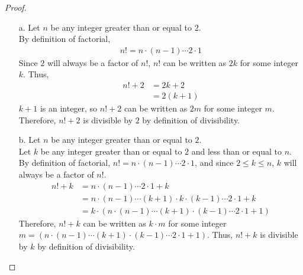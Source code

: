 \documentclass[name=Ojas\ Chaturvedi, emailid=oj.chaturvedi.2024, course=Capstone:\ Discrete\ Math, num=8, deadline={November\ 2,\ 2023}]{homework}
\begin{document}
\begin{proof}
    \begin{enumerate}
        \item[a.]
            Let $n$ be any integer greater than or equal to $2$. \\
            By definition of factorial,
            \begin{align*}
                n! = n \cdot (n-1) \cdots 2 \cdot 1 
            \end{align*}
            Since $2$ will always be a factor of $n!$, $n!$ can be written as $2k$ for some integer $k$.
            Thus,
            \begin{align*}
                n! + 2 &= 2k + 2 \\
                &= 2(k + 1)
            \end{align*}
            $k + 1$ is an integer, so $n! + 2$ can be written as $2m$ for some integer $m$. \\
            Therefore, $n! + 2$ is divisible by $2$ by definition of divisibility.
        \item[b.]
            Let $n$ be any integer greater than or equal to $2$. \\
            Let $k$ be any integer greater than or equal to $2$ and less than or equal to $n$. \\
            By definition of factorial, $n! = n \cdot (n-1) \cdots 2 \cdot 1$, and since $2 \leq k \leq n$, $k$ will always be a factor of $n!$. \\
            \begin{align*}
                n! + k &= n \cdot (n-1) \cdots 2 \cdot 1 + k \\
                &= n \cdot (n-1) \cdots (k+1) \cdot k \cdot (k-1) \cdots 2 \cdot 1 + k \\
                &= k \cdot (n \cdot (n-1) \cdots (k+1) \cdot (k-1) \cdots 2 \cdot 1 + 1)
            \end{align*}
            Therefore, $n! + k$ can be written as $k \cdot m$ for some integer $m = (n \cdot (n-1) \cdots (k+1) \cdot (k-1) \cdots 2 \cdot 1 + 1)$.
            Thus, $n! + k$ is divisible by $k$ by definition of divisibility.
    \end{enumerate}
\end{proof}
\end{document}
